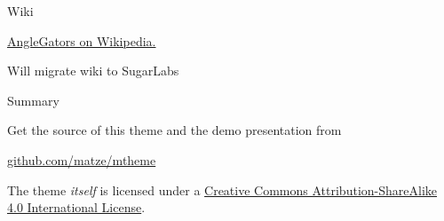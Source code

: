 \documentclass[10pt, compress]{beamer}
\begin{document}
\begin{frame}{Wiki}
    \item \href{https://en.wikipedia.org/wiki/AngleGators}{AngleGators on Wikipedia.} 
    \item Will migrate wiki to SugarLabs

\end{frame}
\centering
\begin{frame}{Summary}

  Get the source of this theme and the demo presentation from

  \begin{center}\url{github.com/matze/mtheme}\end{center}

  The theme \emph{itself} is licensed under a
  \href{http://creativecommons.org/licenses/by-sa/4.0/}{Creative Commons
  Attribution-ShareAlike 4.0 International License}.

  \begin{center}\ccbysa\end{center}

\end{frame}

\end{document}
